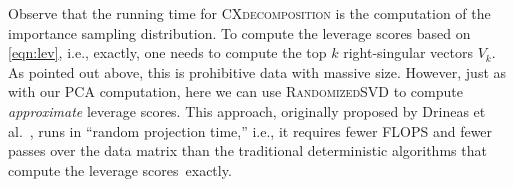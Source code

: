 Observe that the running time for \textsc{CXdecomposition} is the computation of the importance sampling distribution.
To compute the leverage scores based on \eqref{eqn:lev}, i.e., exactly, one needs to compute the top $k$ right-singular vectors $V_k$. 
As pointed out above, this is prohibitive data with massive size.
However, just as with our PCA computation, here we can use \textsc{RandomizedSVD} to compute {\it approximate} leverage scores.
This approach, originally proposed by Drineas et al.~\cite{DMMW12_JMLR}, runs in ``random projection time,'' i.e., it requires fewer FLOPS and fewer passes over the data matrix than the traditional deterministic algorithms that compute the leverage scores~exactly.



